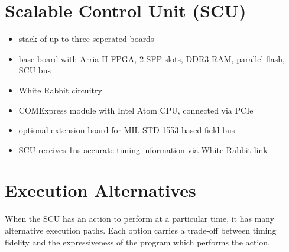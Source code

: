 \documentclass[25pt,halfparskip-,pagesize]{scrartcl}
\begin{document}
\begin{multicols*}{3}
\section{Scalable Control Unit (SCU)}
\begin{itemize}
  \item stack of up to three seperated boards
  \item base board with Arria II FPGA, 2 SFP slots, DDR3 RAM, parallel flash, SCU bus
  \item White Rabbit circuitry
  \item COMExpress module with Intel Atom CPU, connected via PCIe
  \item optional extension board for MIL-STD-1553 based field bus
  \item SCU receives 1ns accurate timing information via White Rabbit link
\end{itemize}

\section{Execution Alternatives}
When the SCU has an action to perform at a particular time,
it has many alternative execution paths.
Each option carries a trade-off between timing fidelity and
the expressiveness of the program which performs the action.


\end{multicols*}
\end{document}
